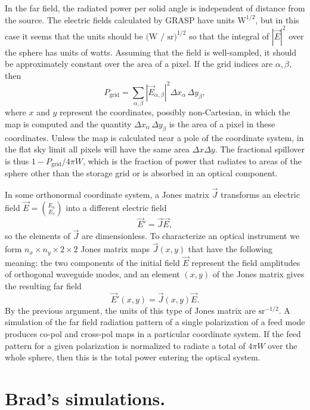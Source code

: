 \documentclass[10pt,english]{article}
\begin{document}
In the far field, the radiated power per solid angle is independent of distance from the source. The electric fields calculated by GRASP have units $\text{W}^{1/2}$, but in this case it seems that the units should be $\text{(W / sr)}^{1/2}$ so that the integral of $|\vec{E}|^{2}$ over the sphere has units of watts.  Assuming that the field is well-sampled, it should be approximately constant over the area of a pixel. If the grid indices are $\alpha, \beta$, then
\begin{equation*}
P_{\text{grid}} = \sum_{\alpha, \beta} | \vec{E}_{\alpha, \beta} |^{2} \Delta x_{\alpha} \, \Delta y_{\beta},
\end{equation*}
where $x$ and $y$ represent the coordinates, possibly non-Cartesian, in which the map is computed and the quantity $\Delta x_{\alpha} \, \Delta y_{\beta}$ is the area of a pixel in these coordinates. Unless the map is calculated near a pole of the coordinate system, in the flat sky limit all pixels will have the same area $\Delta x \Delta y$. The fractional spillover is thus $1 - P_{\text{grid}} / 4 \pi \unit{W}$, which is the fraction of power that radiates to areas of the sphere other than the storage grid or is absorbed in an optical component. 

In some orthonormal coordinate system, a Jones matrix $\vec{J}$ transforms an electric field $\vec{E} = \binom{E_{u}}{E_{v}}$ into a different electric field
\begin{equation*}
\vec{E}' = \vec{J} \vec{E},
\end{equation*}
so the elements of $\vec{J}$ are dimensionless. To characterize an optical instrument we form $n_{x} \times n_{y} \times 2 \times 2$ Jones matrix maps $\vec{J}(x, y)$ that have the following meaning: the two components of the initial field $\vec{E}$ represent the field amplitudes of orthogonal waveguide modes, and an element $(x, y)$ of the Jones matrix gives the resulting far field
\begin{equation*}
\vec{E}'(x, y) = \vec{J}(x, y) \vec{E}.
\end{equation*}
By the previous argument, the units of this type of Jones matrix are $\text{sr}^{-1/2}$. A simulation of the far field radiation pattern of a single polarization of a feed mode produces co-pol and cross-pol maps in a particular coordinate system. If the feed pattern for a given polarization is normalized to radiate a total of $4 \pi \unit{W}$ over the whole sphere, then this is the total power entering the optical system. 


\section*{Brad's simulations.}
\end{document}
